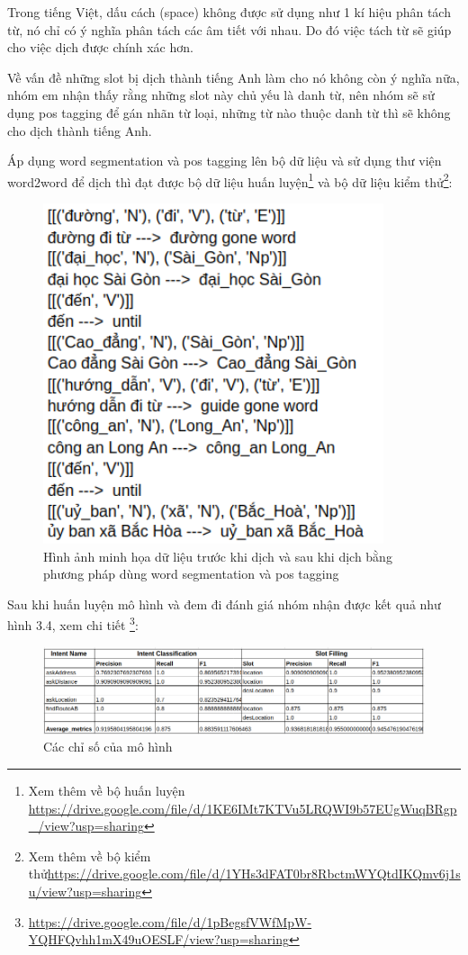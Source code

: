 Trong tiếng Việt, dấu cách (space) không được sử dụng như 1 kí hiệu phân tách từ, nó chỉ có ý nghĩa phân tách các âm tiết với nhau. Do đó việc tách từ sẽ giúp cho việc dịch được chính xác hơn.

Về vấn đề những slot bị dịch thành tiếng Anh làm cho nó không còn ý nghĩa nữa, nhóm em nhận thấy rằng những slot này chủ yếu là danh từ, nên nhóm sẽ sử dụng pos tagging để gán nhãn từ loại, những từ nào thuộc danh từ thì sẽ không cho dịch thành tiếng Anh.

Áp dụng word segmentation và pos tagging lên bộ dữ liệu và sử dụng thư viện word2word để dịch thì đạt được bộ dữ liệu huấn luyện\footnote{Xem thêm về bộ huấn luyện \url{https://drive.google.com/file/d/1KE6IMt7KTVu5LRQWI9b57EUgWuqBRgp_/view?usp=sharing}} và bộ dữ liệu kiểm thử\footnote{Xem thêm về bộ kiểm thử\url{https://drive.google.com/file/d/1YHs3dFAT0br8RbctmWYQtdIKQmv6j1su/view?usp=sharing}}:

\begin{figure}[htp]
    \centering
    \includegraphics[width=10cm]{images/trainingdata-wordsegment.png}
    \caption{Hình ảnh minh họa dữ liệu trước khi dịch và sau khi dịch bằng phương pháp dùng word segmentation và pos tagging}
    \label{fig:sodohethongchiduong}
\end{figure}

Sau khi huấn luyện mô hình và đem đi đánh giá nhóm nhận được kết quả như  hình 3.4, xem chi tiết \footnote{\url{https://drive.google.com/file/d/1pBegsfVWfMpW-YQHFQvhh1mX49uOESLF/view?usp=sharing}}:

\begin{figure}[htp]
    \centering
    \includegraphics[width=15cm]{images/metrics-word2word+postag.png}
    
    \caption{Các chỉ số của mô hình}
    \label{fig:sodohethongchiduong}
\end{figure}

